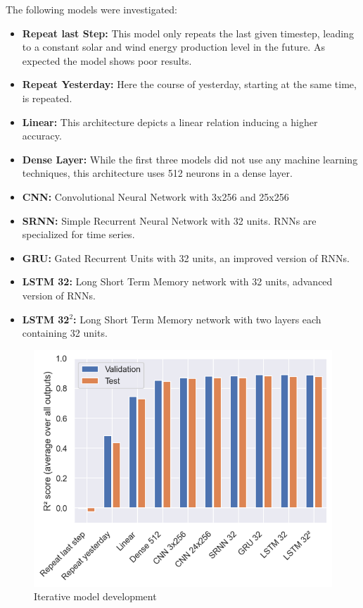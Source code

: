 \documentclass[11pt,table]{article}
\begin{document}
The following models were investigated:

\begin{itemize}
\item \textbf{Repeat last Step:} This model only repeats the last given timestep, leading to a constant solar and wind energy production level in the future. As expected the model shows poor results. 
\item \textbf{Repeat Yesterday:} Here the course of yesterday, starting at the same time, is repeated. 
\item \textbf{Linear:} This architecture depicts a linear relation inducing a higher accuracy.
\item \textbf{Dense Layer:} While the first three models did not use any machine learning techniques, this architecture uses 512 neurons in a dense layer. 
\item \textbf{CNN:} Convolutional Neural Network with 3x256 and 25x256
\item \textbf{SRNN:} Simple Recurrent Neural Network with 32 units. RNNs are specialized for time series.
\item \textbf{GRU:} Gated Recurrent Units with 32 units, an improved version of RNNs. 
\item \textbf{LSTM 32:} Long Short Term Memory network with 32 units, advanced version of RNNs.
\item \textbf{LSTM 32$^2$:} Long Short Term Memory network with two layers each containing 32 units.
\end{itemize}


\begin{figure}[H]
	\centering
	\includegraphics[scale=0.6]{Figures/benchmarks.png}
	\caption{Iterative model development}
	\label{fig:benchmarks}
\end{figure} 
\end{document}
